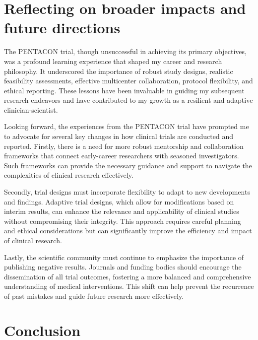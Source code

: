 \documentclass[authordate, reflection]{jote-new-article}
\begin{document}
	\section{Reflecting on broader impacts and future directions}



	The PENTACON trial, though unsuccessful in achieving its primary objectives, was a profound learning experience that shaped my career and research philosophy. It underscored the importance of robust study designs, realistic feasibility assessments, effective multicenter collaboration, protocol flexibility, and ethical reporting. These lessons have been invaluable in guiding my subsequent research endeavors and have contributed to my growth as a resilient and adaptive clinician-scientist.



	Looking forward, the experiences from the PENTACON trial have prompted me to advocate for several key changes in how clinical trials are conducted and reported. Firstly, there is a need for more robust mentorship and collaboration frameworks that connect early-career researchers with seasoned investigators. Such frameworks can provide the necessary guidance and support to navigate the complexities of clinical research effectively.



	Secondly, trial designs must incorporate flexibility to adapt to new developments and findings. Adaptive trial designs, which allow for modifications based on interim results, can enhance the relevance and applicability of clinical studies without compromising their integrity. This approach requires careful planning and ethical considerations but can significantly improve the efficiency and impact of clinical research.



	Lastly, the scientific community must continue to emphasize the importance of publishing negative results. Journals and funding bodies should encourage the dissemination of all trial outcomes, fostering a more balanced and comprehensive understanding of medical interventions. This shift can help prevent the recurrence of past mistakes and guide future research more effectively.



	\section{Conclusion}
\end{document}
